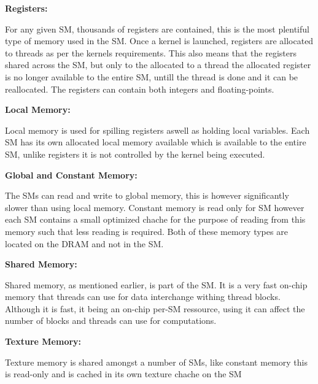 \textbf{Registers:}

For any given SM, thousands of registers are contained, this is the most plentiful type of memory used in the SM. 
Once a kernel is launched, registers are allocated to threads as per the kernels requirements.
This also means that the registers shared across the SM, but only to the allocated to a thread the allocated register is no longer available to the entire SM, untill the thread is done and it can be reallocated.
The registers can contain both integers and floating-points.

\textbf{Local Memory:}

Local memory is used for spilling registers aswell as holding local variables.
Each SM has its own allocated local memory available which is available to the entire SM, unlike registers it is not controlled by the kernel being executed.

\textbf{Global and Constant Memory:}

The SMs can read and write to global memory, this is however significantly slower than using local memory. %
Constant memory is read only for SM however each SM contains a small optimized chache for the purpose of reading from this memory such that less reading is required. Both of these memory types are located on the DRAM and not in the SM.

\textbf{Shared Memory:}

Shared memory, as mentioned earlier, is part of the SM.
It is a very fast on-chip memory that threads can use for data interchange withing thread blocks.
Although it is fast, it being an on-chip per-SM ressource, using it can affect the number of blocks and threads can use for computations.

\textbf{Texture Memory:}

Texture memory is shared amongst a number of SMs, like constant memory this is read-only and is cached in its own texture chache on the SM

